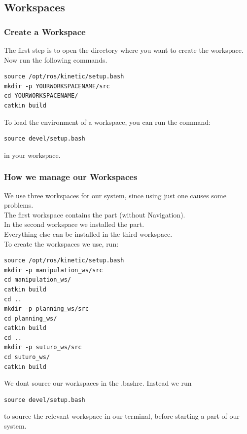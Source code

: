 \documentclass[main.tex]{subfiles}
\begin{document}
	\subsection{Workspaces}
	\subsubsection{Create a Workspace}
	The first step is to open the directory where you want to create the workspace.\\
	Now run the following commands.
	\begin{lstlisting}
source /opt/ros/kinetic/setup.bash
mkdir -p YOURWORKSPACENAME/src
cd YOURWORKSPACENAME/
catkin build 
\end{lstlisting}
	
	To load the environment of a workspace, you can run the command:
	\begin{lstlisting}
source devel/setup.bash
\end{lstlisting}
	in your workspace.
	
	\subsubsection{How we manage our Workspaces} \label{workspace_management}
	
	We use three workspaces for our system, since using just one causes some problems.\\
	The first workspace contains the  part (without Navigation).\\
	In the second workspace we installed the  part.\\
	Everything else can be installed in the third workspace.\\
	To create the workspaces we use, run:\\
	\begin{lstlisting}
source /opt/ros/kinetic/setup.bash
mkdir -p manipulation_ws/src
cd manipulation_ws/
catkin build 
cd ..
mkdir -p planning_ws/src
cd planning_ws/
catkin build 
cd ..
mkdir -p suturo_ws/src
cd suturo_ws/
catkin build 
\end{lstlisting}
	
	We dont source our workspaces in the .bashrc. Instead we run\\
	\begin{lstlisting}
source devel/setup.bash
\end{lstlisting}
to source the relevant workspace in our terminal, before starting a part of our system.
	
\end{document}

